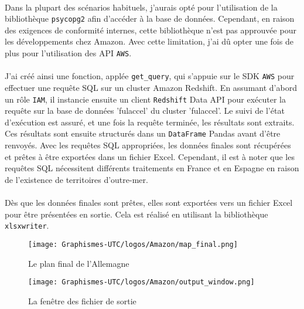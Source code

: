 \paragraph{}
\vspace{-2em}
Dans la plupart des scénarios habituels, j'aurais opté pour l'utilisation de la bibliothèque \texttt{psycopg2} afin d'accéder à la base de données. Cependant, en raison des exigences de conformité internes, cette bibliothèque n'est pas approuvée pour les développements chez Amazon. Avec cette limitation, j'ai dû opter une fois de plus pour l'utilisation des API \texttt{AWS}.
\paragraph{}
\vspace{-2em}
J'ai créé ainsi une fonction, applée \texttt{get\_query}, qui s'appuie sur le SDK \texttt{AWS} pour effectuer une requête SQL sur un cluster Amazon Redshift. En assumant d'abord un rôle \texttt{IAM}, il instancie ensuite un client \texttt{Redshift} Data API pour exécuter la requête sur la base de données 'fulaccel' du cluster 'fulaccel'. Le suivi de l'état d'exécution est assuré, et une fois la requête terminée, les résultats sont extraits. Ces résultats sont ensuite structurés dans un \texttt{DataFrame} Pandas avant d'être renvoyés. Avec les requêtes SQL appropriées, les données finales sont récupérées et prêtes à être exportées dans un fichier Excel. Cependant, il est à noter que les requêtes SQL nécessitent différents traitements en France et en Espagne en raison de l'existence de territoires d'outre-mer.
\paragraph{}
\vspace{-2em}
Dès que les données finales sont prêtes, elles sont exportées vers un fichier Excel pour être présentées en sortie. Cela est réalisé en utilisant la bibliothèque \texttt{xlsxwriter}.
    \begin{figure}[H]
    \centering
    \texttt{[image: Graphismes-UTC/logos/Amazon/map\_final.png]}
    \caption{Le plan final de l'Allemagne}
    \end{figure}

    \begin{figure}[H]
    \centering
    \texttt{[image: Graphismes-UTC/logos/Amazon/output\_window.png]}
    \caption{La fenêtre des fichier de sortie}
    \end{figure}

